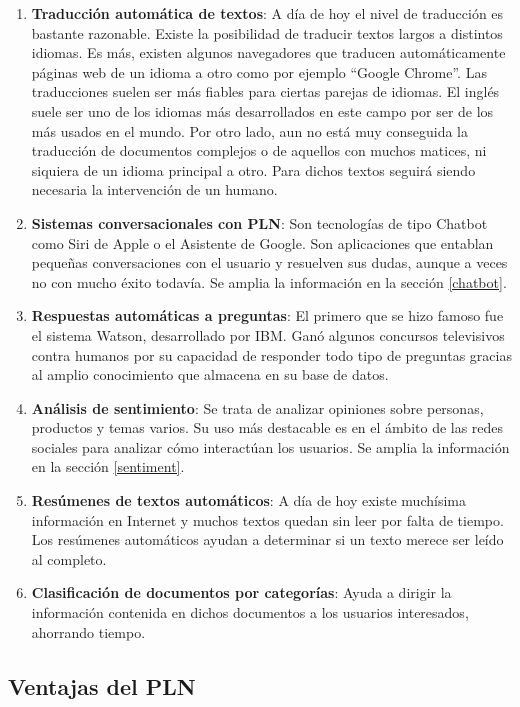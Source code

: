\begin{enumerate}
	\item \textbf{Traducción automática de textos}: A día de hoy el nivel de traducción es bastante razonable. Existe la posibilidad de traducir textos largos a distintos idiomas. Es más, existen algunos navegadores que traducen automáticamente páginas web de un idioma a otro como por ejemplo ``Google Chrome''. Las traducciones suelen ser más fiables para ciertas parejas de idiomas. El inglés suele ser uno de los idiomas más desarrollados en este campo por ser de los más usados en el mundo. Por otro lado, aun no está muy conseguida la traducción de documentos complejos o de aquellos con muchos matices, ni siquiera de un idioma principal a otro. Para dichos textos seguirá siendo necesaria la intervención de un humano.
	\item \textbf{Sistemas conversacionales con PLN}: Son tecnologías de tipo Chatbot como Siri de Apple o el Asistente de Google. Son aplicaciones que entablan pequeñas conversaciones con el usuario y resuelven sus dudas, aunque a veces no con mucho éxito todavía. Se amplia la información en la sección \ref{chatbot}.
	\item \textbf{Respuestas automáticas a preguntas}: El primero que se hizo famoso fue el sistema Watson, desarrollado por IBM. Ganó algunos concursos televisivos contra humanos por su capacidad de responder todo tipo de preguntas gracias al amplio conocimiento que almacena en su base de datos.
	\item \textbf{Análisis de sentimiento}: Se trata de analizar opiniones sobre personas, productos y temas varios. Su uso más destacable es en el ámbito de las redes sociales para analizar cómo interactúan los usuarios. Se amplia la información en la sección \ref{sentiment}.
	\item \textbf{Resúmenes de textos automáticos}: A día de hoy existe muchísima  información en Internet y muchos textos quedan sin leer por falta de tiempo. Los resúmenes automáticos ayudan a determinar si un texto merece ser leído al completo. 
	\item \textbf{Clasificación de documentos por categorías}: Ayuda a dirigir la información contenida en dichos documentos a los usuarios interesados, ahorrando tiempo. 
\end{enumerate}

\subsection{Ventajas del PLN}

